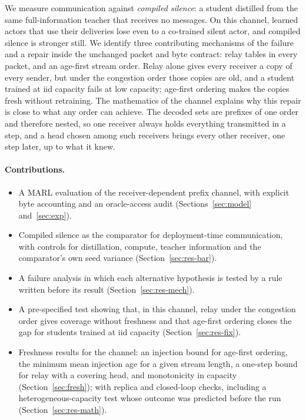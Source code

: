 \documentclass[11pt]{article}
\theoremstyle{definition}
\begin{document}
We measure communication against \emph{compiled silence}: a student distilled from the same full-information teacher that
receives no messages. On this channel, learned actors that use their deliveries lose even to a co-trained silent actor,
and compiled silence is stronger still. We identify three contributing mechanisms of the failure and a repair inside the
unchanged packet and byte contract: relay tables in every packet, and an age-first stream order. Relay alone gives every
receiver a copy of every sender, but under the congestion order those copies are old, and a student trained at iid
capacity fails at low capacity; age-first ordering makes the copies fresh without retraining.
The mathematics of the channel explains why this repair is close to what any order can achieve. The decoded sets are
prefixes of one order and therefore nested, so one receiver always holds everything transmitted in a step, and a head
chosen among such receivers brings every other receiver, one step later, up to what it knew.

\paragraph{Contributions.}
\begin{itemize}
\item A MARL evaluation of the receiver-dependent prefix channel, with explicit byte accounting and an oracle-access audit
(Sections~\ref{sec:model} and~\ref{sec:exp}).
\item Compiled silence as the comparator for deployment-time communication, with controls for distillation, compute,
teacher information and the comparator's own seed variance (Section~\ref{sec:res-bar}).
\item A failure analysis in which each alternative hypothesis is tested by a rule written before its result
(Section~\ref{sec:res-mech}).
\item A pre-specified test showing that, in this channel, relay under the congestion order gives coverage without freshness
and that age-first ordering closes the gap for students trained at iid capacity (Section~\ref{sec:res-fix}).
\item Freshness results for the channel: an injection bound for age-first ordering, the minimum mean injection age for a
given stream length, a one-step bound for relay with a covering head, and monotonicity in capacity
(Section~\ref{sec:fresh}); with replica and closed-loop checks, including a heterogeneous-capacity test whose outcome was
predicted before the run (Section~\ref{sec:res-math}).
\end{itemize}
\end{document}
